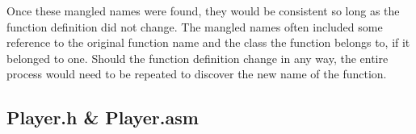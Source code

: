 \documentclass[twoside]{article}
\begin{document}
    \bigbreak
    \noindent
    Once these mangled names were found, they would be consistent so long as the function definition did not change.
    The mangled names often included some reference to the original function name and the class the function belongs to, if it belonged to one.
    Should the function definition change in any way, the entire process would need to be repeated to discover the new name of the function.

    \subsection{Player.h \& Player.asm}\label{subsec:player.h-&-player.asm}

    \bigblock
\end{document}
